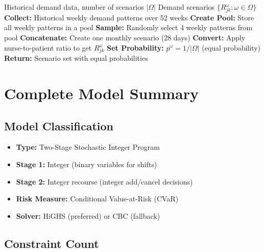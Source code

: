 \documentclass[12pt,a4paper]{article}
\begin{document}
\begin{algorithm}[H]
\caption{Scenario Generation from Historical Data}
\begin{algorithmic}[1]
\Require Historical demand data, number of scenarios $|\Omega|$
\Ensure Demand scenarios $\{R_{jk}^\omega : \omega \in \Omega\}$
\State \textbf{Collect:} Historical weekly demand patterns over 52 weeks
\State \textbf{Create Pool:} Store all weekly patterns in a pool
    \State \textbf{Sample:} Randomly select 4 weekly patterns from pool
    \State \textbf{Concatenate:} Create one monthly scenario (28 days)
    \State \textbf{Convert:} Apply nurse-to-patient ratio to get $R_{jk}^\omega$
    \State \textbf{Set Probability:} $p^\omega = 1/|\Omega|$ (equal probability)
\EndFor
\State \textbf{Return:} Scenario set with equal probabilities
\end{algorithmic}
\end{algorithm}

\newpage

\section{Complete Model Summary}

\subsection{Model Classification}

\begin{itemize}
    \item \textbf{Type:} Two-Stage Stochastic Integer Program
    \item \textbf{Stage 1:} Integer (binary variables for shifts)
    \item \textbf{Stage 2:} Integer recourse (integer add/cancel decisions)
    \item \textbf{Risk Measure:} Conditional Value-at-Risk (CVaR)
    \item \textbf{Solver:} HiGHS (preferred) or CBC (fallback)
\end{itemize}

\subsection{Constraint Count}
\end{document}
